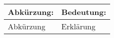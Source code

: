 \renewcommand{\arraystretch}{1.5}
\begin{center}
	\begin{tabular}{|l|l|}\hline
		\multicolumn{1}{|c|}{\textbf{Abkürzung:}} & \multicolumn{1}{c|}{\textbf{Bedeutung:}} \\ \hline
		Abkürzung & Erklärung \\ \hline	
	\end{tabular}
\end{center}
